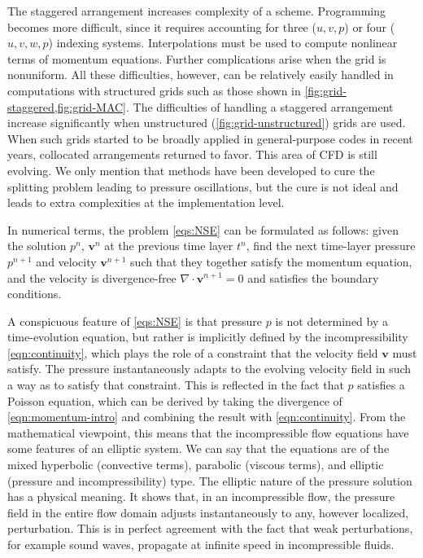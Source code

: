 \documentclass{article}
\numberwithin{equation}{section}
\begin{document}
The staggered arrangement increases complexity of a scheme. 
Programming becomes more difficult, since it requires accounting for three ($u,v,p$) or four ($u,v,w,p$) indexing systems. 
Interpolations must be used to compute nonlinear terms of momentum equations. 
Further complications arise when the grid is nonuniform. 
All these difficulties, however, can be relatively easily handled in computations with structured grids such as those shown in \cref{fig:grid-staggered,fig:grid-MAC}. 
The difficulties of handling a staggered arrangement increase significantly when unstructured (\cref{fig:grid-unstructured}) grids are used. 
When such grids started to be broadly applied in general-purpose codes in recent years, collocated arrangements returned to favor. 
This area of CFD is still evolving. 
We only mention that methods have been developed to cure the splitting problem leading to pressure oscillations, but the cure is not ideal and leads to extra complexities at the implementation level.


In numerical terms, the problem \cref{eqs:NSE} can be formulated as follows: given the solution $p^{n}$, $\boldsymbol{v}^{n}$ at the previous time layer $t^{n}$, find the next time-layer pressure $p^{n+1}$ and velocity $\boldsymbol{v}^{n+1}$ such that they together satisfy the momentum equation, and the velocity is divergence-free $\nabla \cdot \boldsymbol{v}^{n+1} = 0$ and satisfies the boundary conditions.

A conspicuous feature of \cref{eqs:NSE} is that pressure $p$ is not determined by a time-evolution equation, but rather is implicitly defined by the incompressibility \cref{eqn:continuity}, which plays the role of a constraint that the velocity field $\boldsymbol{v}$ must satisfy. The pressure instantaneously adapts to the evolving velocity field in such a way as to satisfy that constraint. This is reflected in the fact that $p$ satisfies a Poisson equation, which can be derived by taking the divergence of \cref{eqn:momentum-intro} and combining the result with \cref{eqn:continuity}. From the mathematical viewpoint, this means that the incompressible flow equations have some features of an elliptic system. We can say that the equations are of the mixed hyperbolic (convective terms), parabolic (viscous terms), and elliptic (pressure and incompressibility) type. The elliptic nature of the pressure solution has a physical meaning. It shows that, in an incompressible flow, the pressure field in the entire flow domain adjusts instantaneously to any, however localized, perturbation. This is in perfect agreement with the fact that weak perturbations, for example sound waves, propagate at infinite speed in incompressible fluids.
\end{document}
